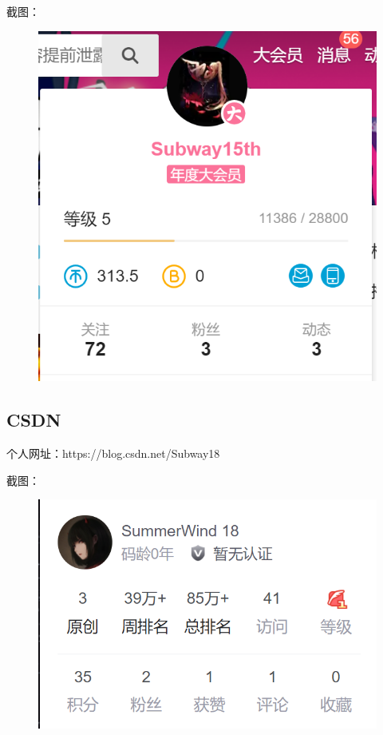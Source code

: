 \documentclass{article}
\begin{document}
截图：
\begin{figure}[H]
    \centering
    \includegraphics[scale=0.28]{Bilibili}
    \label{fig:Bilibili}
\end{figure}

\subsection{CSDN}

个人网址：https://blog.csdn.net/Subway18

截图：
\begin{figure}[H]
    \centering
    \includegraphics[scale=0.5]{CSDN}
    \label{fig:CSDN}
\end{figure}
\end{document}
